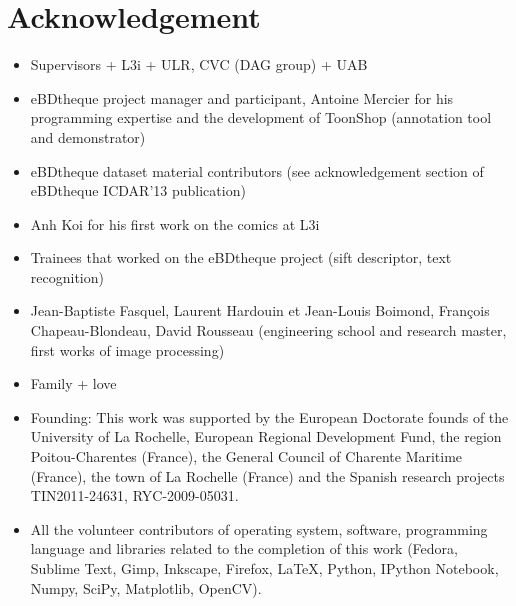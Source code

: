 \chapter*{Acknowledgement}
\begin{itemize}
	\item Supervisors + L3i + ULR, CVC (DAG group) + UAB
	\item eBDtheque project manager and participant, Antoine Mercier for his programming expertise and the development of ToonShop (annotation tool and demonstrator)
	\item eBDtheque dataset material contributors (see acknowledgement section of eBDtheque ICDAR'13 publication)
	\item Anh Koi for his first work on the comics at L3i
	\item Trainees that worked on the eBDtheque project (sift descriptor, text recognition)
	\item Jean-Baptiste Fasquel, Laurent Hardouin et Jean-Louis Boimond, François Chapeau-Blondeau, David Rousseau (engineering school and research master, first works of image processing)
	\item Family + love
	\item Founding: This work was supported by the European Doctorate founds of the  University of La Rochelle, European Regional Development Fund, the region Poitou-Charentes (France), the General Council of Charente Maritime (France), the town of La Rochelle (France) and the Spanish research projects TIN2011-24631, RYC-2009-05031.
	\item All the volunteer contributors of operating system, software, programming language and libraries related to the completion of this work (Fedora, Sublime Text, Gimp, Inkscape, Firefox, \LaTeX, Python, IPython Notebook, Numpy, SciPy, Matplotlib, OpenCV).
\end{itemize}
\clearpage\thispagestyle{empty}